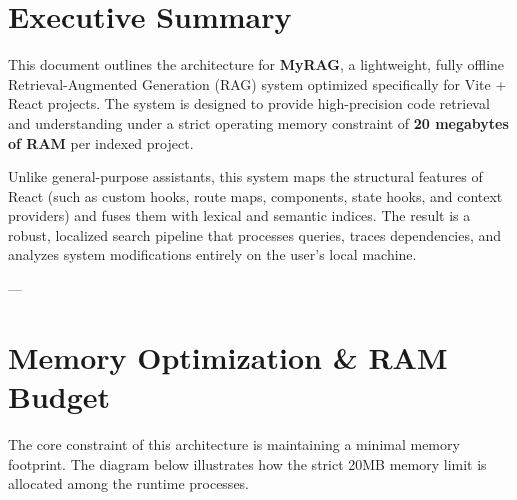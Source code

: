 \documentclass[11pt,a4paper]{article}
\begin{document}
\newpage
\tableofcontents
\newpage

\section{Executive Summary}
This document outlines the architecture for \textbf{MyRAG}, a lightweight, fully offline Retrieval-Augmented Generation (RAG) system optimized specifically for Vite + React projects. The system is designed to provide high-precision code retrieval and understanding under a strict operating memory constraint of \textbf{20 megabytes of RAM} per indexed project.

Unlike general-purpose assistants, this system maps the structural features of React (such as custom hooks, route maps, components, state hooks, and context providers) and fuses them with lexical and semantic indices. The result is a robust, localized search pipeline that processes queries, traces dependencies, and analyzes system modifications entirely on the user's local machine.

---

\section{Memory Optimization \& RAM Budget}
The core constraint of this architecture is maintaining a minimal memory footprint. The diagram below illustrates how the strict 20MB memory limit is allocated among the runtime processes.
\end{document}
